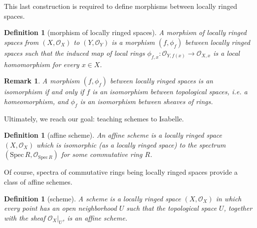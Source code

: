 \documentclass[12pt]{scrartcl}
\newtheorem{definition}[proposition]{Definition}
\newtheorem{remark}[proposition]{Remark}
\def\spec{\text{Spec}\,R}
\begin{document}

This last construction is required to define morphisms between locally ringed spaces.
			
\begin{definition}[morphism of locally ringed spaces]
	A morphism of locally ringed spaces from $(X, \mathscr{O}_X)$ to $(Y, \mathscr{O}_Y)$ is a morphism $(f, \phi_f)$ between locally ringed spaces such that the induced map of local rings $\phi_{f, x}: \mathscr{O}_{Y, f(x)} \rightarrow \mathscr{O}_{X, x}$ is a local homomorphism for every $x \in X$.  
\end{definition}


\begin{remark}
	A morphism $(f, \phi_f)$ between locally ringed spaces is an isomorphism if and only if $f$ is an isomorphism between topological spaces, \textit{i.e.} a homeomorphism, and $\phi_f$ is an isomorphism between sheaves of rings.
\end{remark}


Ultimately, we reach our goal: teaching schemes to Isabelle.	

\begin{definition}[affine scheme]
	An affine scheme is a locally ringed space $(X, \mathscr{O}_X)$ which is isomorphic (as a locally ringed space) to the spectrum $(\text{Spec}\,R, \mathscr{O}_{\spec})$ for some commutative ring $R$. 
\end{definition}


Of course, spectra of commutative rings being locally ringed spaces provide a class of affine schemes.


\begin{definition}[scheme]
	A scheme is a locally ringed space $(X, \mathscr{O}_X)$ in which every point has an open neighborhood $U$ such that the topological space $U$, together with the sheaf $\mathscr{O}_X | _U$, is an affine scheme.
\end{definition}

\end{document}

